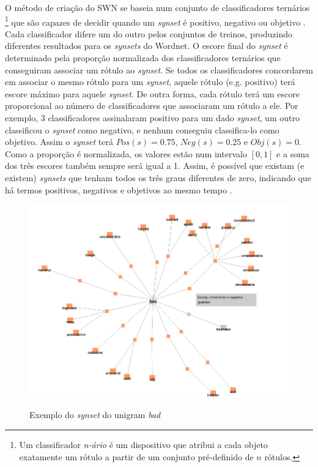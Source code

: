  

O método de criação do SWN se baseia num conjunto de classificadores ternários \footnote{Um classificador \textit{n-ário} é um dispositivo que atribui a cada objeto exatamente um rótulo a partir de um conjunto pré-definido de $n$ rótulos.} que são capazes de decidir quando um \textit{synset} é positivo, negativo ou objetivo \cite{esuli2006sentiwordnet}. Cada classificador difere um do outro pelos conjuntos de treinos, produzindo diferentes resultados para os \textit{synsets} do Wordnet. O escore final do \textit{synset} é determinado pela proporção normalizada dos classificadores ternários que conseguiram associar um rótulo ao \textit{synset}. Se todos os classificadores concordarem em associar o mesmo rótulo para um \textit{synset}, aquele rótulo (e.g. positivo) terá escore máximo para aquele \textit{synset}. De outra forma, cada rótulo terá um escore proporcional ao número de classificadores que associaram um rótulo a ele. Por exemplo, 3 classificadores assinalaram positivo para um dado \textit{synset}, um outro classificou o \textit{synset} como negativo, e nenhum conseguiu classifica-lo como objetivo. Assim o \textit{synset} terá $Pos(s) = 0.75$, $Neg(s) = 0.25$ e $Obj(s) = 0$. Como a proporção é normalizada, os valores estão num intervalo $[0,1]$ e a soma dos três escores também sempre será igual a 1. Assim, é possível que existam (e existem) \textit{synsets} que tenham todos os três graus diferentes de zero, indicando que há termos positivos, negativos e objetivos ao mesmo tempo \cite{esuli2006sentiwordnet}. 

\begin{figure}[h]
\caption{Exemplo do \textit{synset} do unigram \textit{bad}}
\centering
\includegraphics[scale=0.5]{bad_synset}
\label{figura:bad_synset}
\end{figure}
 
